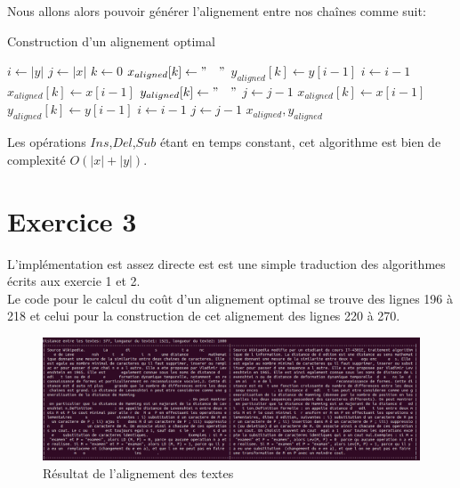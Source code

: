 \documentclass{article}
\begin{document}
Nous allons alors pouvoir générer l'alignement entre nos chaînes comme suit:
\begin{algorithm}
\caption{Construction d'un alignement optimal}\label{algo:alignement}
\begin{algorithmic}[1]
	\State $i \gets  \lvert y \rvert $	
	\State $j \gets  \lvert x \rvert $	
	\State $k \gets 0$
			\State $x_{aligned}[k] \gets "\quad"$
			\State $y_{aligned}[k] \gets y[i-1]$
			\State $i \gets i-1$
			\State $x_{aligned}[k] \gets x[i-1]$
			\State $y_{aligned}[k] \gets "\quad"$
			\State $j \gets j-1$
			\State $x_{aligned}[k] \gets x[i-1]$
			\State $y_{aligned}[k] \gets y[i-1]$
			\State $i \gets i-1$
			\State $j \gets j-1$
		\EndIf
	\EndWhile	
	\State\Return $x_{aligned}, y_{aligned}$
\EndProcedure
\end{algorithmic}
\end{algorithm}

Les opérations $Ins$,$Del$,$Sub$ étant en temps constant, cet algorithme est 
bien de complexité $O(\lvert x\rvert+\lvert y\rvert)$.

\section{Exercice 3}

L'implémentation est assez directe est est une simple traduction des
algorithmes écrits aux exercie 1 et 2.\\
Le code pour le calcul du coût d'un alignement optimal se trouve des lignes 196
à 218 et celui pour la construction de cet alignement des lignes 220 à 270.\\

\begin{figure}[!hbt]
	\centering
	\includegraphics[width=0.95\linewidth]{./images/exo3.png}
	\caption{Résultat de l'alignement des textes}%
	\label{fig:exo3}
\end{figure}
\end{document}
